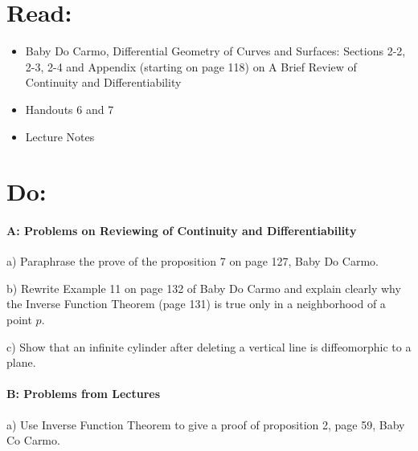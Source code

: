 \documentclass[12pt]{article}
\title{\rightline {\Huge {Due: Wed. October 4}}}
\author{\LARGE {HMC\quad Math 142 \quad Fall 2017} 
\\ {Prof. Gu}  
\\ {\LARGE Problem Set 5}}
\date{Start this assignment before Sunday night!}
\begin{document}
\maketitle

\section*{ Read: } 

\begin{itemize}
\item{Baby Do Carmo, Differential Geometry
    of Curves and Surfaces:  
Sections 2-2, 2-3, 2-4 and  Appendix (starting on page 118) on A Brief
Review of Continuity and Differentiability}
\item{Handouts 6 and 7}
\item{Lecture Notes}
\end{itemize}

\section*{ Do: }
\paragraph{A: Problems on Reviewing of Continuity and Differentiability}
\begin{itemize}
{\item a) Paraphrase the prove of the proposition 7 on page 127, Baby Do Carmo.} 
{\item b) Rewrite Example 11 on page 132 of Baby Do Carmo and explain 
clearly why the Inverse Function Theorem (page 131) is true only in a
neighborhood of a point $p$. } 
{\item c) Show that an infinite cylinder after deleting a vertical line is 
diffeomorphic to a plane.}
\end{itemize}

\medskip
\paragraph{B: Problems from Lectures}

\begin{itemize}
{\item a) Use Inverse Function Theorem to give a proof 
of proposition 2, page 59, Baby Co Carmo.}

\end{itemize}
\end{document}
